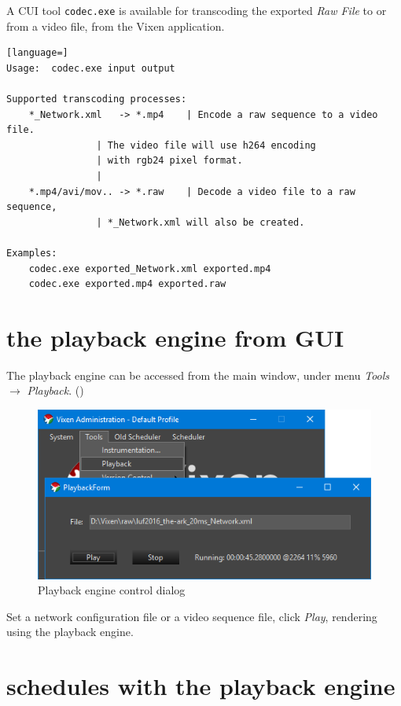 A CUI tool \texttt{codec.exe} is available for transcoding the exported \textit{Raw File} to or from a video file,  from the Vixen application.

\renewcommand{\baselinestretch}{1}
\begin{lstlisting}[language=]
Usage:  codec.exe input output

Supported transcoding processes:
    *_Network.xml   -> *.mp4	| Encode a raw sequence to a video file.
				| The video file will use h264 encoding
				| with rgb24 pixel format.
				|
    *.mp4/avi/mov.. -> *.raw	| Decode a video file to a raw sequence,
				| *_Network.xml will also be created.

Examples:
    codec.exe exported_Network.xml exported.mp4
    codec.exe exported.mp4 exported.raw
\end{lstlisting}
\renewcommand{\baselinestretch}{\mystretch}

\section{ the playback engine from GUI}

The playback engine can be accessed from the main window, under menu \textit{Tools} $\rightarrow$ \textit{Playback}. ()

\begin{figure}[!htb]
  \centering
  \includegraphics[width=0.7\columnwidth]{Figs/vixen_playback.png}
  \caption{\footnotesize Playback engine control dialog}
  \label{fig:guide_playback}
\end{figure}

Set a network configuration file or a video sequence file, click \textit{Play},  rendering  using the  playback engine.

\section{ schedules with the playback engine}

